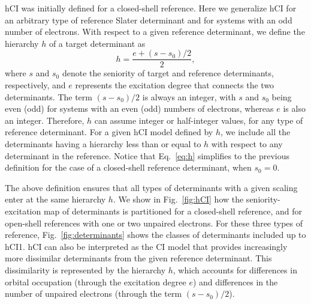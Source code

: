 \documentclass[aip,jcp,reprint,noshowkeys,superscriptaddress]{revtex4-1}
\begin{document}
hCI was initially defined for a closed-shell reference. \cite{Kossoski_2022}
Here we generalize hCI for an arbitrary type of reference Slater determinant and for systems with an odd number of electrons.
With respect to a given reference determinant, we define the hierarchy $h$ of a target determinant as
\begin{equation}
  \label{eq:h}
  h = \frac{e+ (s-s_0)/2}{2},
\end{equation}
where $s$ and $s_0$ denote the seniority of target and reference determinants, respectively, and $e$ represents the excitation degree that connects the two determinants.
The term $(s-s_0)/2$ is always an integer, with $s$ and $s_0$ being even (odd) for systems with an even (odd) numbers of electrons, whereas $e$ is also an integer.
Therefore, $h$ can assume integer or half-integer values, for any type of reference determinant.
For a given hCI model defined by $h$, we include all the determinants having a hierarchy less than or equal to $h$ with respect to any determinant in the reference.
Notice that Eq.~\eqref{eq:h} simplifies to the previous definition \cite{Kossoski_2022} for the case of a closed-shell reference determinant, when $s_0 = 0$.

The above definition ensures that all types of determinants with a given scaling enter at the same hierarchy $h$.
We show in Fig.~\ref{fig:hCI} how the seniority-excitation map of determinants is partitioned for a closed-shell reference, and for open-shell references with one or two unpaired electrons.
For these three types of reference, Fig.~\ref{fig:determinants} shows the classes of determinants included up to hCI1.
hCI can also be interpreted as the CI model that provides increasingly more dissimilar determinants from the given reference determinant.
This dissimilarity is represented by the hierarchy $h$, which accounts for differences in orbital occupation (through the excitation degree $e$)
and differences in the number of unpaired electrons (through the term $(s-s_0)/2$).
 
\end{document}
